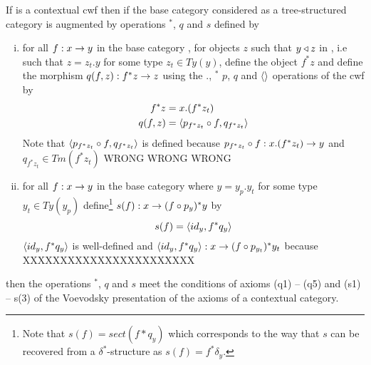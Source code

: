 \begin{lemma}
If \catcw is a contextual cwf then if the base category considered as a tree-structured category is augmented  by operations $^*$, $q$ and $s$ defined by
\begin{enumerate} [(i)]
\item for all $f: x \rightarrow y$ in the base category \catcw, for objects $z$ such that $y \triangleleft z$ in \catcw, i.e such that
$z=z_t.y$ for some type $z_t \in Ty(y)$, define the object $f^*z$ 
and define the  morphism $q(f,z):f^*z \rightarrow z$  using the $.$, $^*$ $p$, $q$ and $\langle\rangle$ operations of the cwf \catcw   by
\begin{align}
f^*z    & = x.(f^*z_t) \\
q(f,z) & =\langle p_{f^*z_t} \circ f,q_{f^*z_t}\rangle
\end{align}
Note that $\langle p_{f^*z_t} \circ f,q_{f^*z_t}\rangle$ is defined because 
$p_{f^*z_t} \circ f: x.(f^*z_t) \rightarrow y$ and $q_{f^*z_t} \in Tm(f^*z_t)$ WRONG WRONG WRONG
\item 
for all $f : x \rightarrow y$ in the base category \catcw where $y=y_p.y_t$ for some type $y_t \in Ty(y_p)$ 
define\footnote{Note that $s(f) = sect(f*q_y)$ which corresponds to the way that 
$s$ can be recovered from a $\delta^*$-structure as $s(f)=f^*\delta_y$.} $s(f):x \rightarrow (f\circ p_y)^*y$ by
\begin{equation}
s(f) = \langle id_y,f^*q_y\rangle
\end{equation}
$\langle id_y,f^*q_y\rangle$ is well-defined and $\langle id_y,f^*q_y\rangle:x \rightarrow (f \circ p_{y_t})^*y_t$
because XXXXXXXXXXXXXXXXXXXXXXX
\end{enumerate}
then  the operations $^*$, $q$ and $s$ 
meet the conditions of axioms (q1) -- (q5) and (s1) -- s(3) of the Voevodsky presentation of the axioms of a contextual category.
\end{lemma}
